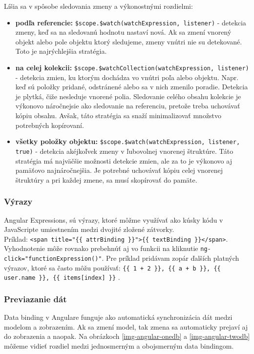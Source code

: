 \noindent Líšia sa v spôsobe sledovania zmeny a výkonostnými rozdielmi:
\begin{itemize}
  \item \textbf{podľa referencie:} \verb|$scope.$watch(watchExpression, listener)| - detekcia zmeny, keď sa na sledovanú hodnotu nastaví nová. Ak sa zmení vnorený objekt alebo pole objektu ktorý sledujeme, zmeny vnútri nie su detekované. Toto je najrýchlejšia stratégia.
  \item \textbf{na celej kolekcii:} \verb|$scope.$watchCollection(watchExpression, listener)| - detekcia zmien, ku ktorým dochádza vo vnútri poľa alebo objektu. Napr. keď sú položky pridané, odstránené alebo sa v nich zmenilo poradie. Detekcia je plytká, čiže nesleduje vnorené polia. Sledovanie celého obsahu kolekcie je výkonovo náročnejsie ako sledovanie na referenciu, pretože treba uchovávať kópiu obsahu. Avšak, táto stratégia sa snaží minimalizovať množstvo potrebných kopírovaní.
  \item \textbf{všetky položky objektu:} \verb|$scope.$watch(watchExpression, listener, true)| - detekcia akéjkoľvek zmeny v ľubovolnej vnorenej štruktúre. Táto stratégia má najväčšie možnosti detekcie zmien, ale za to je výkonovo aj pamäťovo najnáročnejšia. Je potrebné uchovávať kópiu celej vnorenej štruktúry a pri každej zmene, sa musí skopírovať do pamäte.
\end{itemize}


\subsubsection{Výrazy}
Angular Expressions, sú výrazy, ktoré môžme využívať ako kúsky kódu v JavaScripte umiestnením medzi dvojité zložené zátvorky.\\
Príklad: \verb|<span title="{{ attrBinding }}">{{ textBinding }}</span>|. Vyhodnotenie môže rovnako prebehnúť aj vo funkcii na kliknutie \verb|ng-click="functionExpression()"|.
Pre príklad pridávam zopár ďalších platných výrazov, ktoré sa často môžu používať: \verb|{{ 1 + 2 }}, {{ a + b }}, {{ user.name }}, {{ items[index] }}| \cite{angular-docs}.





\subsubsection{Previazanie dát}
Data binding v Angulare funguje ako automatická synchronizácia dát medzi modelom a zobrazením. Ak sa zmení model, tak zmena sa automaticky prejaví aj do zobrazenia a naopak.
Na obrázkoch \ref{img-angular-onedb} a \ref{img-angular-twodb} môžeme vidieť rozdiel medzi jednosmerným a obojsmerným data bindingom.

